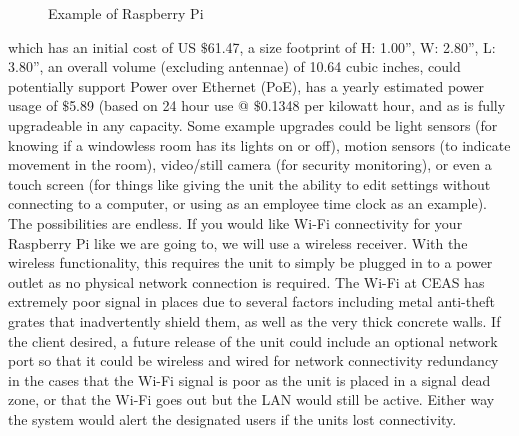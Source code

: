\documentclass{report}
\begin{document}
\begin{figure}[H]
\caption{Example of Raspberry Pi}
\end{figure}
which has an initial cost of US $\$$61.47, a size footprint of H: 1.00”, W: 2.80”, L: 3.80”, an overall volume (excluding antennae) of 10.64 cubic inches, could potentially support Power over Ethernet (PoE), has a yearly estimated power usage of $\$$5.89 (based on 24 hour use @ $\$$0.1348 per kilowatt hour, and as is fully upgradeable in any capacity.
Some example upgrades could be light sensors (for knowing if a windowless room has its lights on or off), motion sensors (to indicate movement in the room), video/still camera (for security monitoring), or even a touch screen (for things like giving the unit the ability to edit settings without connecting to a computer, or using as an employee time clock as an example).
The possibilities are endless.
If you would like Wi-Fi connectivity for your Raspberry Pi like we are going to, we will use a wireless receiver. With the wireless functionality, this requires the unit to simply be plugged in to a power outlet as no physical network connection is required. The Wi-Fi at CEAS has extremely poor signal in places due to several factors including metal anti-theft grates that inadvertently shield them, as well as the very thick concrete walls. If the client desired, a future release of the unit could include an optional network port so that it could be wireless and wired for network connectivity redundancy in the cases that the Wi-Fi signal is poor as the unit is placed in a signal dead zone, or that the Wi-Fi goes out but the LAN would still be active.  Either way the system would alert the designated users if the units lost connectivity.
\end{document}
